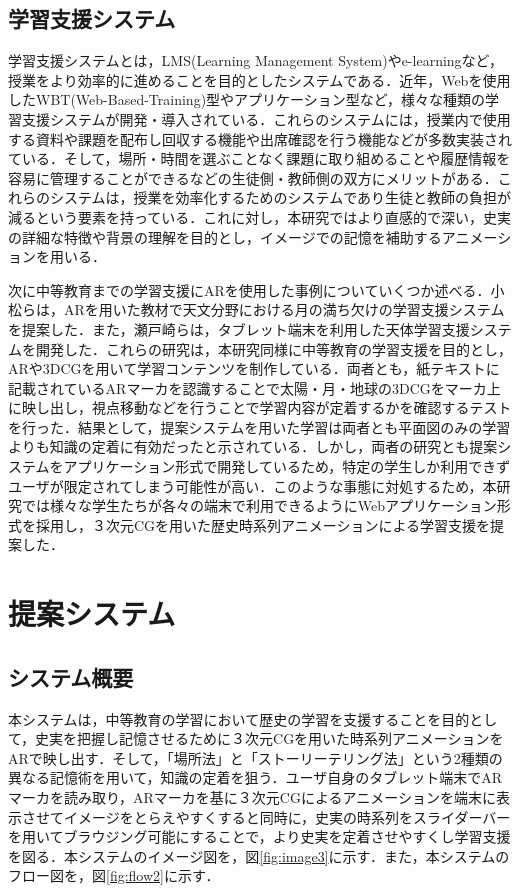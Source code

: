 \documentclass[a4paper,dvipdfmx]{hisken}
\begin{document}
\subsection{学習支援システム}

学習支援システムとは，LMS(Learning Management System)\cite{tsuji}やe-learning\cite{oomu}など，授業をより効率的に進めることを目的としたシステムである．近年，Webを使用したWBT(Web-Based-Training)型\cite{wbt}やアプリケーション型\cite{takahasi}など，様々な種類の学習支援システムが開発・導入されている．これらのシステムには，授業内で使用する資料や課題を配布し回収する機能や出席確認を行う機能などが多数実装されている．そして，場所・時間を選ぶことなく課題に取り組めることや履歴情報を容易に管理することができるなどの生徒側・教師側の双方にメリットがある．これらのシステムは，授業を効率化するためのシステムであり生徒と教師の負担が減るという要素を持っている．これに対し，本研究ではより直感的で深い，史実の詳細な特徴や背景の理解を目的とし，イメージでの記憶を補助するアニメーションを用いる．

次に中等教育までの学習支援にARを使用した事例についていくつか述べる．小松ら\cite{komatsu}は，ARを用いた教材で天文分野における月の満ち欠けの学習支援システムを提案した．また，瀬戸崎ら\cite{setozaki}は，タブレット端末を利用した天体学習支援システムを開発した．これらの研究は，本研究同様に中等教育の学習支援を目的とし，ARや3DCGを用いて学習コンテンツを制作している．両者とも，紙テキストに記載されているARマーカを認識することで太陽・月・地球の3DCGをマーカ上に映し出し，視点移動などを行うことで学習内容が定着するかを確認するテストを行った．結果として，提案システムを用いた学習は両者とも平面図のみの学習よりも知識の定着に有効だったと示されている．しかし，両者の研究とも提案システムをアプリケーション形式で開発しているため，特定の学生しか利用できずユーザが限定されてしまう可能性が高い．このような事態に対処するため，本研究では様々な学生たちが各々の端末で利用できるようにWebアプリケーション形式を採用し，３次元CGを用いた歴史時系列アニメーションによる学習支援を提案した．


\section{提案システム}
\subsection{システム概要}

本システムは，中等教育の学習において歴史の学習を支援することを目的として，史実を把握し記憶させるために３次元CGを用いた時系列アニメーションをARで映し出す．そして，「場所法」と「ストーリーテリング法」という2種類の異なる記憶術を用いて，知識の定着を狙う．ユーザ自身のタブレット端末でARマーカを読み取り，ARマーカを基に３次元CGによるアニメーションを端末に表示させてイメージをとらえやすくすると同時に，史実の時系列をスライダーバーを用いてブラウジング可能にすることで，より史実を定着させやすくし学習支援を図る．本システムのイメージ図を，図\ref{fig:image3}に示す．また，本システムのフロー図を，図\ref{fig:flow2}に示す．
\end{document}
